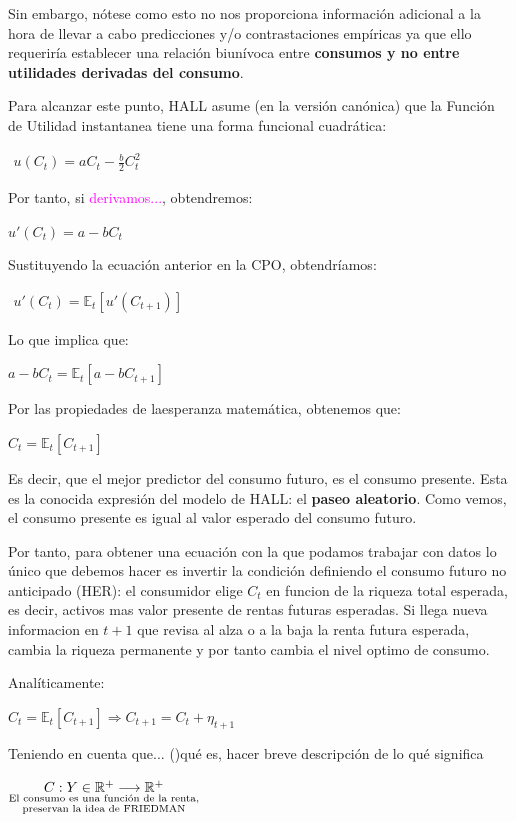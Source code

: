 \documentclass[10pt,a4paper]{article}
\begin{document}
Sin embargo, nótese como esto no nos proporciona información adicional a la hora de llevar a cabo predicciones y/o contrastaciones empíricas ya que ello requeriría establecer una relación biunívoca entre \textbf{consumos y no entre utilidades derivadas del consumo}. 

Para alcanzar este punto, HALL asume (en la versión canónica) que la Función de Utilidad instantanea tiene una forma funcional cuadrática:

$\begin{aligned}
  u(C_t)=aC_t-\frac{b}{2}C_t^2
\end{aligned}$

Por tanto, si \textcolor{magenta}{derivamos...}, obtendremos:

$u'(C_t)=a-bC_t$

Sustituyendo la ecuación anterior en la CPO, obtendríamos:

$\begin{aligned}
  u'(C_t)=\mathbb E_t[u'(C_{t+1})]
\end{aligned}$

Lo que implica que:

$a-bC_t=\mathbb E_t[a-bC_{t+1}]$

Por las propiedades de laesperanza matemática, obtenemos que:

$C_t=\mathbb E_t[C_{t+1}]$

Es decir, que el mejor predictor del consumo futuro, es el consumo presente. Esta es la conocida expresión del modelo de HALL: el \textbf{paseo aleatorio}. Como vemos, el consumo presente es igual al valor esperado del consumo futuro.

Por tanto, para obtener una ecuación con la que podamos trabajar con datos lo único que debemos hacer es invertir la condición definiendo el consumo futuro no anticipado (HER): el consumidor elige $C_t$ en funcion de la riqueza total esperada, es decir, activos mas valor presente de rentas futuras esperadas. Si llega nueva informacion en $t+1$ que revisa al alza o a la baja la renta futura esperada, cambia la riqueza permanente y por tanto cambia el nivel optimo de consumo. 

Analíticamente:

$C_t=\mathbb E_t[C_{t+1}]\Longrightarrow C_{t+1}=C_t+\eta_{t+1}$

\textcolor{magetna}{Teniendo en cuenta que... ()qué es, hacer breve descripción de lo qué significa}

$\underset{\substack{\text{\scriptsize El consumo es una función de la renta,}\\\text{\scriptsize preservan la idea de FRIEDMAN}}}{C:Y\in \mathbb R^+\longrightarrow \mathbb R^+}$
\end{document}
